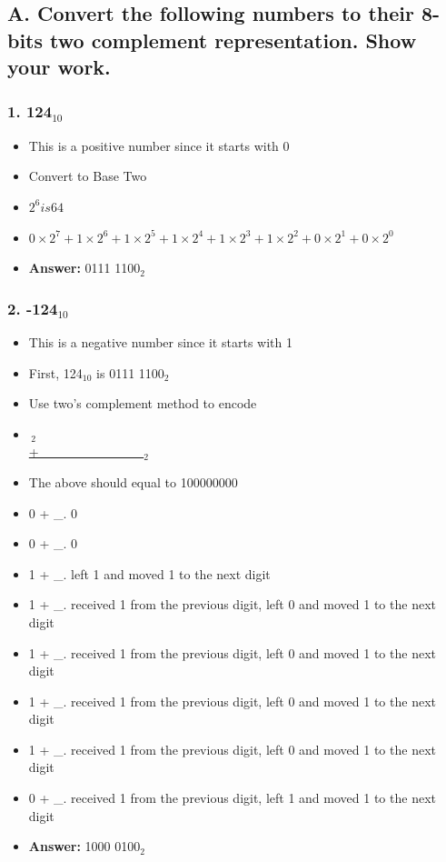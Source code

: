 \documentclass[11pt, oneside]{article}
\begin{document}
\subsection*{A. Convert the following numbers to their 8-bits two complement representation. Show your work.}

\subsubsection*{1. 124$_{10}$}

\begin{itemize}
    \item This is a positive number since it starts with 0
    \item Convert to Base Two
    \item \(2^6 is 64\)
    \item \(0\times2^7 + 1\times2^6 + 1\times2^5 + 1\times2^4 + 1\times2^3 + 1\times2^2 + 0\times2^1 + 0\times2^0\)
    \item \textbf{Answer:} 0111 1100$_{2}$
\end{itemize}

\subsubsection*{2. -124$_{10}$}

\begin{itemize}
    \item This is a negative number since it starts with 1
    \item First, 124$_{10}$ is 0111 1100$_{2}$
    \item Use two’s complement method to encode
    \item \,\;$_{2}$ \\\underline{+\_\_\_\_\_\_\_\_\_\_\_$_{2}$}
    \item The above should equal to 100000000
    \item 0 + \_. 0
    \item 0 + \_. 0
    \item 1 + \_. left 1 and moved 1 to the next digit
    \item 1 + \_. received 1 from the previous digit, left 0 and moved 1 to the next digit
    \item 1 + \_. received 1 from the previous digit, left 0 and moved 1 to the next digit
    \item 1 + \_. received 1 from the previous digit, left 0 and moved 1 to the next digit
    \item 1 + \_. received 1 from the previous digit, left 0 and moved 1 to the next digit
    \item 0 + \_. received 1 from the previous digit, left 1 and moved 1 to the next digit
    \item \textbf{Answer:} 1000 0100$_{2}$
\end{itemize}
\end{document}
